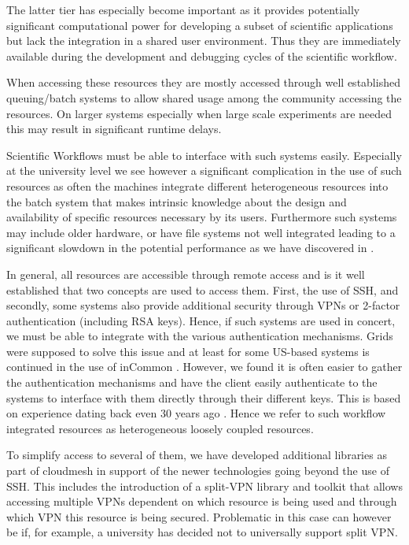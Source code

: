 \documentclass[utf8]{FrontiersinVancouver} %
\newcommand{\TODO}[1]{\todo[inline]{#1}}
\begin{document}
The latter tier has especially become important as it provides potentially significant computational power for developing a subset of scientific applications but lack the integration in a shared user environment. Thus they are immediately available during the development and debugging cycles of the scientific workflow.

When accessing these resources they are mostly accessed through well established queuing/batch systems to allow shared usage among the community accessing the resources. On larger systems especially when large scale experiments are needed this may result in significant runtime delays.

Scientific Workflows must be able to interface with such systems easily. Especially at the university level we see however a significant complication in the use of such resources as often the machines integrate different heterogeneous resources into the batch system that makes intrinsic knowledge about the design and availability of specific resources necessary by its users. Furthermore such systems may include older hardware, or have file systems not well integrated leading to a significant slowdown in the potential performance as we have discovered in \citep{earthquake?}. \TODO{cite}

In general, all resources are accessible through remote access and is it well established that two concepts are used to access them. First, the use of SSH, and secondly, some systems also provide additional security through VPNs or 2-factor authentication (including RSA keys). Hence, if such systems are used in concert, we must be able to integrate with the various authentication mechanisms. Grids were supposed to solve this issue and at least for some US-based systems is continued in the use of inCommon \citep{incommon}. However, we found it is often easier to gather the authentication mechanisms and have the client easily authenticate to the systems to interface with them directly through their different keys. This is based on experience dating back even 30 years ago \cite{las-99-loosely}. Hence we refer to such workflow integrated resources as heterogeneous loosely coupled resources.

To simplify access to several of them, we have developed additional libraries as part of cloudmesh in
support of the newer technologies going beyond the use of SSH. This includes the introduction of a split-VPN library and toolkit that allows accessing multiple VPNs dependent on which resource is being used and through which VPN this resource is being secured. Problematic in this case can however be if, for example, a university has decided not to universally support split VPN.
\end{document}
